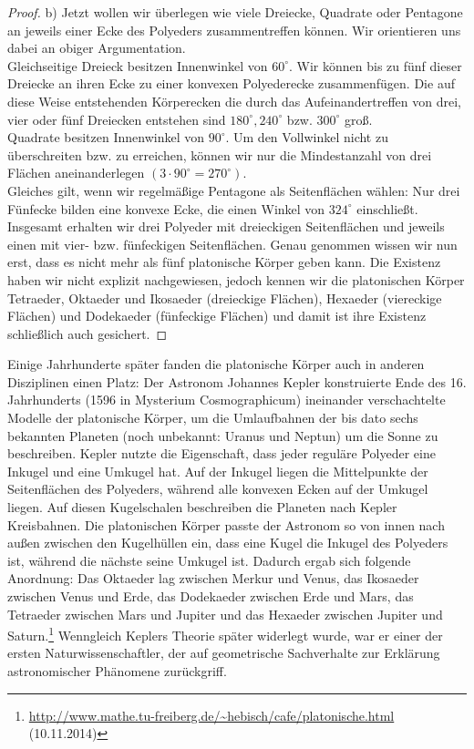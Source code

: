 \begin{proof}
b) Jetzt wollen wir überlegen wie viele Dreiecke, Quadrate oder Pentagone an jeweils einer Ecke des Polyeders zusammentreffen können. Wir orientieren uns dabei an obiger Argumentation.\\
Gleichseitige Dreieck besitzen Innenwinkel von $60^\circ$. Wir können bis zu fünf dieser Dreiecke an ihren Ecke zu einer konvexen Polyederecke zusammenfügen. Die auf diese Weise entstehenden Körperecken die durch das Aufeinandertreffen von drei, vier oder fünf Dreiecken entstehen sind  $180^\circ, 240^\circ$ bzw. $300^\circ$ groß.\\
Quadrate besitzen Innenwinkel von $90^\circ$. Um den Vollwinkel nicht zu überschreiten bzw. zu erreichen, können wir nur die Mindestanzahl von drei Flächen aneinanderlegen $(3\cdot90^\circ=270^\circ)$.\\
Gleiches gilt, wenn wir regelmäßige Pentagone als Seitenflächen wählen: Nur drei Fünfecke bilden eine konvexe Ecke, die einen Winkel von $324^\circ$ einschließt.\\
Insgesamt erhalten wir drei Polyeder mit dreieckigen Seitenflächen und jeweils einen mit vier- bzw. fünfeckigen Seitenflächen. Genau genommen wissen wir nun erst, dass es nicht mehr als fünf platonische Körper geben kann. Die Existenz haben wir nicht explizit nachgewiesen, jedoch kennen wir die platonischen Körper Tetraeder, Oktaeder und  Ikosaeder (dreieckige Flächen), Hexaeder (viereckige Flächen) und Dodekaeder (fünfeckige Flächen) und damit ist ihre Existenz schließlich auch gesichert.
\end{proof}
Einige Jahrhunderte später fanden die platonische Körper auch in anderen Disziplinen einen Platz:
Der Astronom Johannes Kepler konstruierte Ende des 16. Jahrhunderts (1596 in Mysterium Cosmographicum) ineinander verschachtelte Modelle der platonische Körper, um die Umlaufbahnen der bis dato sechs bekannten Planeten (noch unbekannt: Uranus und Neptun) um die Sonne zu beschreiben. Kepler nutzte die Eigenschaft, dass jeder reguläre Polyeder eine Inkugel und eine Umkugel hat. Auf der Inkugel liegen die Mittelpunkte der Seitenflächen des Polyeders, während alle konvexen Ecken auf der Umkugel liegen. Auf diesen Kugelschalen beschreiben die Planeten nach Kepler Kreisbahnen. Die platonischen Körper passte der Astronom so von innen nach außen zwischen den Kugelhüllen ein, dass eine Kugel die Inkugel des Polyeders ist, während die nächste seine Umkugel ist. Dadurch ergab sich folgende Anordnung: Das Oktaeder lag zwischen Merkur und Venus, das Ikosaeder zwischen Venus und Erde, das Dodekaeder zwischen Erde und Mars, das Tetraeder zwischen Mars und Jupiter und das Hexaeder zwischen Jupiter und Saturn.\footnote{\url{http://www.mathe.tu-freiberg.de/~hebisch/cafe/platonische.html} (10.11.2014)}  Wenngleich Keplers Theorie später widerlegt wurde, war er einer der ersten Naturwissenschaftler, der auf geometrische Sachverhalte zur Erklärung astronomischer Phänomene zurückgriff.\\
